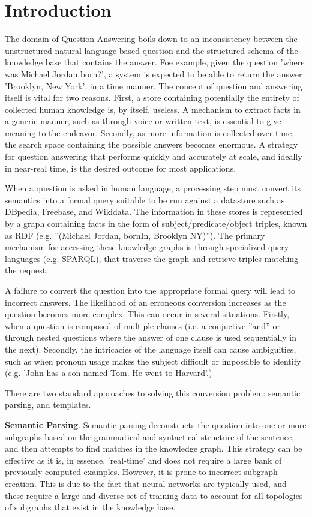 \documentclass[sigplan,screen]{acmart}
\begin{document}
\section*{Introduction}
The domain of Question-Answering boils down to an inconsistency between the unstructured natural language based question and the structured schema of the knowledge base that contains the answer. Foe example, given the question 'where was Michael Jordan born?', a system is expected to be able to return the answer 'Brooklyn, New York', in a time manner. The concept of question and answering itself is vital for two reasons. First, a store containing potentially the entirety of collected human knowledge is, by itself, useless. A mechanism to extract facts in a generic manner, such as through voice or written text, is essential to give meaning to the endeavor. Secondly, as more information is collected over time, the search space containing the possible answers becomes enormous. A strategy for question answering that performs quickly and accurately at scale, and ideally in near-real time, is the desired outcome for most applications.

When a question is asked in human language, a processing step must convert its semantics into a formal query suitable to be run against a datastore such as DBpedia, Freebase, and Wikidata. The information in these stores is represented by a graph containing facts in the form of subject/predicate/object triples, known as RDF (e.g. ''(Michael Jordan, bornIn, Brooklyn NY)''). The primary mechanism for accessing these knowledge graphs is through specialized query languages (e.g. SPARQL), that traverse the graph and retrieve triples matching the request.

A failure to convert the question into the appropriate formal query will lead to incorrect answers. The likelihood of an erroneous conversion increases as the question becomes more complex. This can occur in several situations. Firstly, when a question is composed of multiple clauses (i.e. a conjuctive ''and'' or through nested questions where the answer of one clause is used sequentially in the next). Secondly, the intricacies of the language itself can cause ambiguities, such as when pronoun usage makes the subject difficult or impossible to identify (e.g. 'John has a son named Tom. He went to Harvard'.)

There are two standard approaches to solving this conversion problem: semantic parsing, and templates.

\textbf{Semantic Parsing}. Semantic parsing deconstructs the question into one or more subgraphs based on the grammatical and syntactical structure of the sentence, and then attempts to find matches in the knowledge graph. This strategy can be effective as it is, in essence, 'real-time' and does not require a large bank of previously computed examples. However, it is prone to incorrect subgraph creation. This is due to the fact that neural networks are typically used, and these require a large and diverse set of training data to account for all topologies of subgraphs that exist in the knowledge base.
\end{document}
